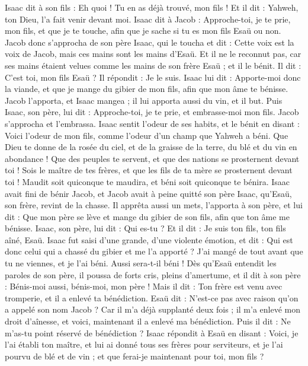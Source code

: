 \begin{multicols}{2}
Isaac dit à son fils : Eh quoi ! Tu en as déjà trouvé, mon fils ! Et il dit : Yahweh, ton Dieu, l'a fait venir devant moi.
Isaac dit à Jacob : Approche-toi, je te prie, mon fils, et que je te touche, afin que je sache si tu es mon fils Esaü ou non.
Jacob donc s'approcha de son père Isaac, qui le toucha et dit : Cette voix est la voix de Jacob, mais ces mains sont les mains d'Esaü.
Et il ne le reconnut pas, car ses mains étaient velues comme les mains de son frère Esaü ; et il le bénit.
Il dit : C'est toi, mon fils Esaü ? Il répondit : Je le suis.
Isaac lui dit : Apporte-moi donc la viande, et que je mange du gibier de mon fils, afin que mon âme te bénisse. Jacob l'apporta, et Isaac mangea ; il lui apporta aussi du vin, et il but.
Puis Isaac, son père, lui dit : Approche-toi, je te prie, et embrasse-moi mon fils.
Jacob s'approcha et l'embrassa. Isaac sentit l'odeur de ses habits, et le bénit en disant : Voici l'odeur de mon fils, comme l'odeur d'un champ que Yahweh a béni.
Que Dieu te donne de la rosée du ciel, et de la graisse de la terre, du blé et du vin en abondance !
Que des peuples te servent, et que des nations se prosternent devant toi ! Sois le maître de tes frères, et que les fils de ta mère se prosternent devant toi ! Maudit soit quiconque te maudira, et béni soit quiconque te bénira.
Isaac avait fini de bénir Jacob, et Jacob avait à peine quitté son père Isaac, qu'Esaü, son frère, revint de la chasse.
Il apprêta aussi un mets, l'apporta à son père, et lui dit : Que mon père se lève et mange du gibier de son fils, afin que ton âme me bénisse.
Isaac, son père, lui dit : Qui es-tu ? Et il dit : Je suis ton fils, ton fils aîné, Esaü.
Isaac fut saisi d'une grande, d'une violente émotion, et dit : Qui est donc celui qui a chassé du gibier et me l'a apporté ? J'ai mangé de tout avant que tu ne viennes, et je l'ai béni. Aussi sera-t-il béni !
Dès qu'Esaü entendit les paroles de son père, il poussa de forts cris, pleins d'amertume, et il dit à son père : Bénis-moi aussi, bénis-moi, mon père !
Mais il dit : Ton frère est venu avec tromperie, et il a enlevé ta bénédiction.
Esaü dit : N'est-ce pas avec raison qu'on a appelé son nom Jacob ? Car il m'a déjà supplanté deux fois ; il m'a enlevé mon droit d'aînesse, et voici, maintenant il a enlevé ma bénédiction. Puis il dit : Ne m'as-tu point réservé de bénédiction ?
Isaac répondit à Esaü en disant : Voici, je l'ai établi ton maître, et lui ai donné tous ses frères pour serviteurs, et je l'ai pourvu de blé et de vin ; et que ferai-je maintenant pour toi, mon fils ?

\end{multicols}

